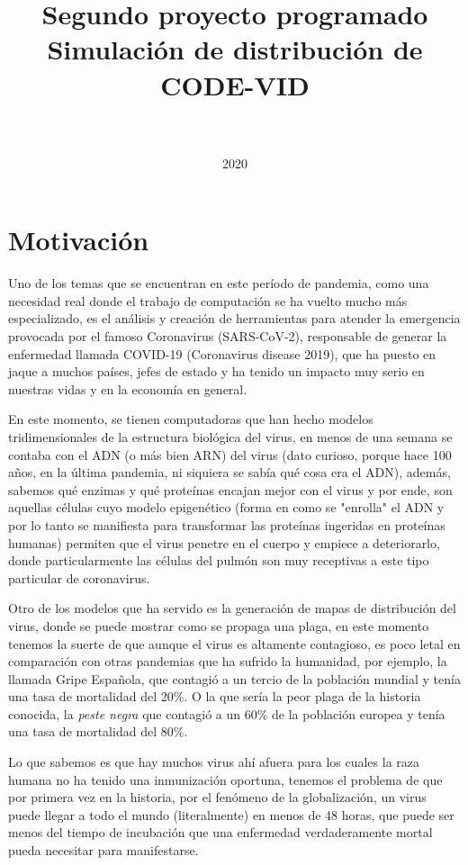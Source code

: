 \documentclass[11pt]{article}
\title{\textbf{Segundo proyecto programado\\Simulación de distribución de CODE-VID}}
\author{\NombreProfesor \\ \NombreCurso \\ 2020  }
\date{}
\begin{document}
\maketitle

\section{Motivación}

Uno de los temas que se encuentran en este período de pandemia, como una necesidad real donde el trabajo de computación se ha vuelto mucho más especializado, es el análisis y creación de herramientas para atender la emergencia provocada por el famoso Coronavirus (SARS-CoV-2), responsable de generar la enfermedad llamada COVID-19 (Coronavirus disease 2019), que ha puesto en jaque a muchos países, jefes de estado y ha tenido un impacto muy serio en nuestras vidas y en la economía en general.

En este momento, se tienen computadoras que han hecho modelos tridimensionales de la estructura biológica del virus, en menos de una semana se contaba con el ADN (o más bien ARN) del virus (dato curioso, porque hace 100 años, en la última pandemia, ni siquiera se sabía qué cosa era el ADN), además, sabemos qué enzimas y qué proteínas encajan mejor con el virus y por ende, son aquellas células cuyo modelo epigenético (forma en como se "enrolla" el ADN y por lo tanto se manifiesta para transformar las proteínas ingeridas en proteínas humanas) permiten que el virus penetre en el cuerpo y empiece a deteriorarlo, donde particularmente las células del pulmón son muy receptivas a este tipo particular de coronavirus.

Otro de los modelos que ha servido es la generación de mapas de distribución del virus, donde se puede mostrar como se propaga una plaga, en este momento tenemos la suerte de que aunque el virus es altamente contagioso, es poco letal en comparación con otras pandemias que ha sufrido la humanidad, por ejemplo, la llamada Gripe Española, que contagió a un tercio de la población mundial y tenía una tasa de mortalidad del 20\%. O la que sería la peor plaga de la historia conocida, la \textit{peste negra} que contagió a un 60\% de la población europea y tenía una tasa de mortalidad del 80\%.

Lo que sabemos es que hay muchos virus ahí afuera para los cuales la raza humana no ha tenido una inmunización oportuna, tenemos el problema de que por primera vez en la historia, por el fenómeno de la globalización, un virus puede llegar a todo el mundo (literalmente) en menos de 48 horas, que puede ser menos del tiempo de incubación que una enfermedad verdaderamente mortal pueda necesitar para manifestarse. 
\end{document}
